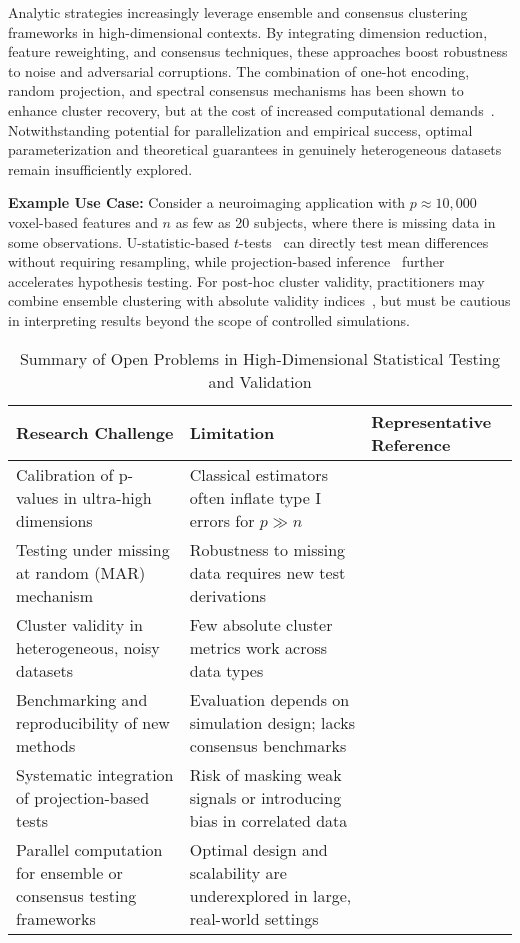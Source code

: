 \documentclass[sigconf]{acmart}
\begin{document}
Analytic strategies increasingly leverage ensemble and consensus clustering frameworks in high-dimensional contexts. By integrating dimension reduction, feature reweighting, and consensus techniques, these approaches boost robustness to noise and adversarial corruptions. The combination of one-hot encoding, random projection, and spectral consensus mechanisms has been shown to enhance cluster recovery, but at the cost of increased computational demands~\cite{ref92,ref95}. Notwithstanding potential for parallelization and empirical success, optimal parameterization and theoretical guarantees in genuinely heterogeneous datasets remain insufficiently explored.

\textbf{Example Use Case:} Consider a neuroimaging application with $p\approx10,000$ voxel-based features and $n$ as few as 20 subjects, where there is missing data in some observations. U-statistic-based $t$-tests~\cite{ref95} can directly test mean differences without requiring resampling, while projection-based inference~\cite{ref91,ref92} further accelerates hypothesis testing. For post-hoc cluster validity, practitioners may combine ensemble clustering with absolute validity indices~\cite{ref113}, but must be cautious in interpreting results beyond the scope of controlled simulations.

\begin{table*}[htbp]
\centering
\caption{Summary of Open Problems in High-Dimensional Statistical Testing and Validation}
\label{tab:open_problems_high_dim}
\begin{adjustbox}{max width=\textwidth}
\begin{tabular}{@{}lll@{}}
\toprule
Research Challenge & Limitation & Representative Reference \\
\midrule
Calibration of p-values in ultra-high dimensions & Classical estimators often inflate type I errors for $p \gg n$ & \cite{ref95} \\
Testing under missing at random (MAR) mechanism & Robustness to missing data requires new test derivations & \cite{ref94} \\
Cluster validity in heterogeneous, noisy datasets & Few absolute cluster metrics work across data types & \cite{ref113} \\
Benchmarking and reproducibility of new methods & Evaluation depends on simulation design; lacks consensus benchmarks & \cite{ref93,ref95} \\
Systematic integration of projection-based tests & Risk of masking weak signals or introducing bias in correlated data & \cite{ref91,ref92,ref93} \\
Parallel computation for ensemble or consensus testing frameworks & Optimal design and scalability are underexplored in large, real-world settings & \cite{ref95} \\
\bottomrule
\end{tabular}
\end{adjustbox}
\end{table*}
\end{document}
